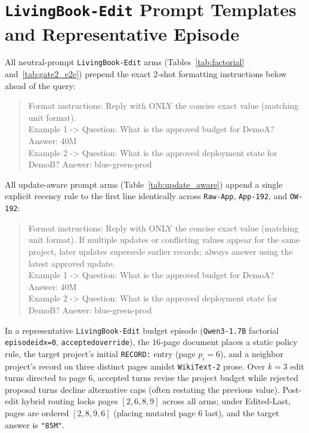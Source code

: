 \documentclass[10pt]{article}
\renewcommand{\_}{\origunderscore\allowbreak}
\begin{document}
\section{\texttt{LivingBook-Edit} Prompt Templates and Representative Episode}
\label{app:prompt}
All neutral-prompt \texttt{LivingBook-Edit} arms (Tables~\ref{tab:factorial} and~\ref{tab:gate2_e2e}) prepend the exact $2$-shot formatting instructions below ahead of the query:
\begin{quote}\small\ttfamily
Format instructions: Reply with ONLY the concise exact value (matching unit format).\\
Example 1 -> Question: What is the approved budget for DemoA? Answer: 40M\\
Example 2 -> Question: What is the approved deployment state for DemoB? Answer: blue-green-prod
\end{quote}
All update-aware prompt arms (Table~\ref{tab:update_aware}) append a single explicit recency rule to the first line identically across \texttt{Raw-App}, \texttt{App-192}, and \texttt{OW-192}:
\begin{quote}\small\ttfamily
Format instructions: Reply with ONLY the concise exact value (matching unit format). If multiple updates or conflicting values appear for the same project, later updates supersede earlier records; always answer using the latest approved update.\\
Example 1 -> Question: What is the approved budget for DemoA? Answer: 40M\\
Example 2 -> Question: What is the approved deployment state for DemoB? Answer: blue-green-prod
\end{quote}
In a representative \texttt{LivingBook-Edit} budget episode (\texttt{Qwen3-1.7B} factorial \texttt{episode\_idx=0}, \texttt{accepted\_override}), the $16$-page document places a static policy rule, the target project's initial \texttt{RECORD:} entry (page $p_i = 6$), and a neighbor project's record on three distinct pages amidst \texttt{WikiText-2} prose. Over $k=3$ edit turns directed to page $6$, accepted turns revise the project budget while rejected proposal turns decline alternative caps (often restating the previous value). Post-edit hybrid routing locks pages $[2, 6, 8, 9]$ across all arms; under Edited-Last, pages are ordered $[2, 8, 9, 6]$ (placing mutated page $6$ last), and the target answer is \texttt{"85M"}.
\end{document}
